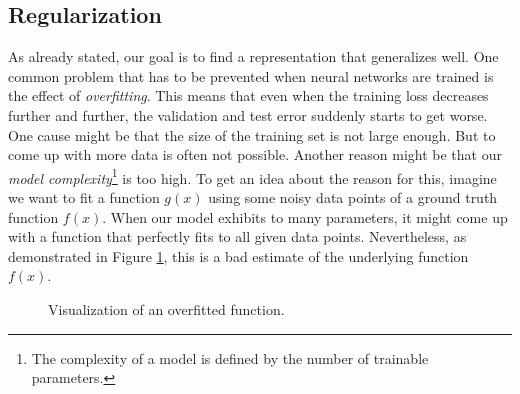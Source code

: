 \subsection{Regularization}

As already stated, our goal is to find a representation that generalizes well. One common problem that has to be prevented when neural networks are trained is the effect of \textit{overfitting}. This means that even when the training loss decreases further and further, the validation and test error suddenly starts to get worse. One cause might be that the size of the training set is not large enough. But to come up with more data is often not possible. Another reason might be that our \textit{model complexity}\footnote{The complexity of a model is defined by the number of trainable parameters.} is too high. To get an idea about the reason for this, imagine we want to fit a function $g(x)$ using some noisy data points of a ground truth function $f(x)$. When our model exhibits to many parameters, it might come up with a function that perfectly fits to all given data points. Nevertheless, as demonstrated in Figure \ref{fig:overfitting}, this is a bad estimate of the underlying function $f(x)$.

\begin{figure}[htpb]
  \centering
  \caption[Regularization and Overfitting]{Visualization of an overfitted function.}\label{fig:overfitting}
\end{figure}

